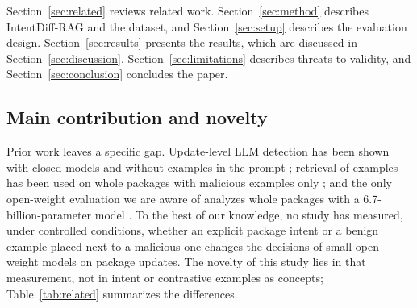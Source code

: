 \documentclass[a4paper,fleqn]{cas-dc}
\begin{document}
Section~\ref{sec:related} reviews related work.
Section~\ref{sec:method} describes IntentDiff-RAG and the dataset, and
Section~\ref{sec:setup} describes the evaluation design.
Section~\ref{sec:results} presents the results, which are discussed in
Section~\ref{sec:discussion}. Section~\ref{sec:limitations} describes threats
to validity, and Section~\ref{sec:conclusion} concludes the paper.

\subsection{Main contribution and novelty}\label{sec:contrib}
Prior work leaves a specific gap. Update-level LLM detection has been shown
with closed models and without examples in the prompt
\citep{wyss2025evaluating}; retrieval of examples has been used on whole
packages with malicious examples only \citep{guo2026bridging}; and the only
open-weight evaluation we are aware of analyzes whole packages with a
6.7-billion-parameter model \citep{nguyen2025taint}. To the best of our
knowledge, no study has measured, under controlled conditions, whether an
explicit package intent or a benign example placed next to a malicious one
changes the decisions of small open-weight models on package updates. The
novelty of this study lies in that measurement, not in intent or contrastive
examples as concepts; Table~\ref{tab:related} summarizes the differences.
\end{document}
